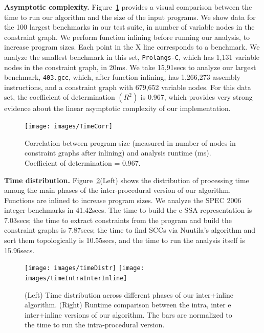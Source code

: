 \documentclass{llncs}
\begin{document}

\noindent
\textbf{Asymptotic complexity.}
Figure~\ref{fig:TimeCorr} provides a visual comparison between the time to
run our algorithm and the size of the input programs.
We show data for the 100 largest benchmarks in our test suite, in number
of variable nodes in the constraint graph.
We perform function inlining before running our analysis, to increase program
sizes.
Each point in the X line corresponds to a benchmark.
We analyze the smallest benchmark in this set, \texttt{Prolangs-C}, which has
1,131 variable nodes in the constraint graph, in 20ms.
We take 15,91secs to analyze our largest benchmark, \texttt{403.gcc}, which,
after function inlining, has 1,266,273 assembly instructions, and a
constraint graph with 679,652 variable nodes.
For this data set, the coefficient of determination $(R^2)$ is 0.967, which
provides very strong evidence about the linear asymptotic complexity of our
implementation.

\begin{figure}[t!]
\begin{center}
\texttt{[image: images/TimeCorr]}
\end{center}
\caption{\label{fig:TimeCorr}
Correlation between program size (measured in number of nodes in constraint
graphs after inlining) and analysis runtime (ms).
Coefficient of determination = 0.967.
}
\end{figure}

\noindent
\textbf{Time distribution.}
Figure~\ref{fig:timeComp}(Left) shows the distribution of processing time
among the main phases of the inter-procedural version of our algorithm.
Functions are inlined to increase program sizes.
We analyze the SPEC 2006 integer benchmarks in 41.42secs.
The time to build the e-SSA representation is 7.03secs; the time to extract
constraints from the program and build the constraint graphs is 7.87secs;
the time to find SCCs via Nuutila's algorithm and sort them topologically is
10.55secs, and the time to run the analysis itself is 15.96secs.

\begin{figure}[t!]
\begin{center}
\texttt{[image: images/timeDistr]}
\texttt{[image: images/timeIntraInterInline]}
\end{center}
\caption{\label{fig:timeComp}
(Left) Time distribution across different phases of our inter+inline
algorithm.
(Right) Runtime comparison between the intra, inter e inter+inline versions of
our algorithm.
The bars are normalized to the time to run the intra-procedural version.
}
\end{figure}
\end{document}
